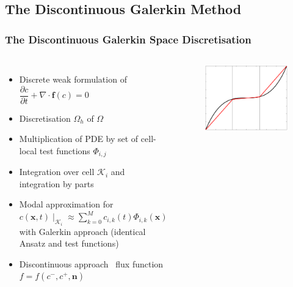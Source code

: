 	\subsection{The Discontinuous Galerkin Method}
	\begin{frame}
		\frametitle{The Discontinuous Galerkin Space Discretisation}
		\begin{columns}[t]
			\column[]{8.2cm}
			\vspace{-0.5cm}
			\begin{itemize}
				\item Discrete weak formulation of $\dfrac{\partial c}{\partial t} + \nabla \cdot \boldsymbol{f}(c) = 0 $
				\item Discretisation $\Omega_h$ of $\Omega$
				\item Multiplication of PDE by set of cell-local test functions $\Phi_{i,j}$
				\item Integration over cell $\mathcal{K}_i$ and integration by parts
				\item Modal approximation for $c(\mathbf{x} , t)\mid _{\mathcal{K}_i} \approx \sum_{k = 0}^{M}c_{i,k}(t) \Phi_{i,k}(\mathbf{x})$ with Galerkin approach (identical Ansatz and test functions)
				\item Discontinuous approach \MVRightArrow \, flux function $f = f(c^-, c^+, \mathbf{n})$
			\end{itemize}
			\vspace{-0.3cm}
			\column[]{3.8cm}
			\begin{figure}[ht]
				\vspace{-1cm}
				\includegraphics[height=0.31\textheight]{img/fem_cropped.pdf}

\end{figure}
\end{columns}
\end{frame}
